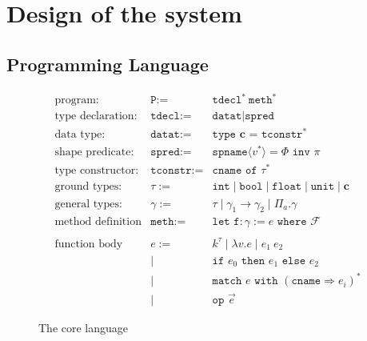 
\chapter{Design of the system}
\label{ch:design}
\vspace{2em}


\section{Programming Language}


\begin{figure}[htp]
$$\begin{array}{rrl}
    \text{program}: & \texttt{P} := &\texttt{tdecl}^* \ \texttt{meth}^* \\
    \text{type declaration}: & \texttt{tdecl} := & \texttt{datat} \mid \texttt{spred} \\
    \text{data type}: & \texttt{datat} := & \texttt{type } \mathbf{c} \texttt{ = } \texttt{tconstr}^* \\
    \text{shape predicate}: & \texttt{spred} := & \texttt{spname}\langle v^* \rangle = \Phi \texttt{ inv } \pi \\
    \text{type constructor}: & \texttt{tconstr} := & \texttt{cname of } \tau^* \\
    \text{ground types}: &\tau := & \texttt{int} \mid \texttt{bool} \mid \texttt{float} \mid \texttt{unit} \mid \mathbf{c} \\  
    \text{general types}: &\gamma := & \tau \mid \gamma_1 \rightarrow \gamma_2 \mid \Pi_{a}.\gamma \\  
    \text{method definition} & \texttt{meth} := 
       & \texttt{let f}: \gamma := e  \texttt{ where } \mathcal{F}  \\
    \\
    \text{function body} & e := & k^{\tau} \mid \lambda v.e \mid e_1 \ e_2 \\
    & \mid & \texttt{if } e_0 \texttt{ then } e_1 \texttt{ else } e_2 \\
    & \mid & \texttt{match } e \texttt{ with } (\texttt{cname} \Rightarrow e_i)^* \\
    & \mid & \texttt{op } \vec{e}
\end{array}$$
    \caption{The core language}
    \label{fig:LanAST}
\end{figure}




